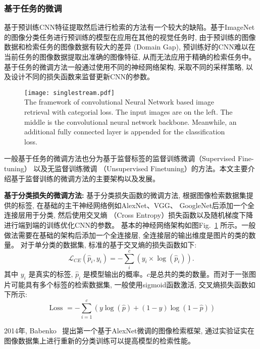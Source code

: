 \subsubsection{基于任务的微调}
基于预训练CNN特征提取然后进行检索的方法有一个较大的缺陷。基于ImageNet的图像分类任务进行预训练的模型在应用在其他的视觉任务时, 由于预训练的图像数据和检索任务的图像数据有较大的差异 (Domain Gap), 预训练好的CNN难以在当前任务的图像数据提取出准确的图像特征, 从而无法应用于精确的检索任务中。基于任务的微调方法一般通过使用不同的神经网络架构, 采取不同的采样策略, 以及设计不同的损失函数来监督更新CNN的参数。
\begin{figure}[!htp]
    \centering
    \texttt{[image: singlestream.pdf]} \\
      {The framework of convolutional Neural Network based image retrieval with categorial loss. The input images are on the left. The middle is the convolutional neural network backbone. Meanwhile, an additional fully connected layer is appended for the classification loss.  }
   \label{fig:featurestream}
\end{figure}
一般基于任务的微调方法也分为基于监督标签的监督训练微调（Supervised Fine-tuning） 以及无监督训练微调 （Unsupervised Finetuning）的方法。本文主要介绍基于监督训练的微调方法的主要架构以及发展。\par
\textbf{基于分类损失的微调方法:} 基于分类损失函数的微调方法, 根据图像检索数据集提供的标签, 在基础的主干神经网络例如AlexNet、VGG、 GoogleNet后添加一个全连接层用于分类, 然后使用交叉熵 （Cross Entropy）损失函数以及随机梯度下降进行端到端的训练优化CNN的参数。 基本的神经网络架构如图Fig.~\ref{fig:featurestream} 所示。一般做法需要在基础的架构后添加一个全连接层, 全连接层的输出维度是图片的类的数量。 对于单分类的数据集, 标准的基于交叉熵的损失函数如下:
\begin{equation}
    \mathcal{L}_{C E}\left(\hat{p}_i, y_i\right)=-\sum_i^c\left(y_i \times \log \left(\hat{p}_i\right)\right).
\end{equation}
其中 $y_i$ 是真实的标签, $\hat{p}_i$ 是模型输出的概率。$c$是总共的类的数量。而对于一张图片可能具有多个标签的检索数据集, 一般使用sigmoid函数激活, 交叉熵损失函数如下所示:
\begin{equation}
    \text { Loss }=-\sum_{i=1}^c(y \log (\hat{p})+(1-y) \log (1-\hat{p}))
    \label{eq:ce}
\end{equation} \par
2014年, Babenko~\cite{babenko2014neural} 提出第一个基于AlexNet微调的图像检索框架, 通过实验证实在图像数据集上进行重新的分类训练可以提高模型的检索性能。 \par

